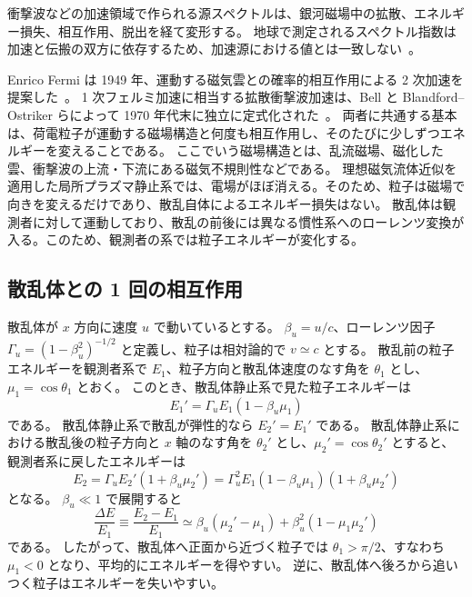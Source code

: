\documentclass[book,paper=a4,fontsize=11pt]{jlreq}
\begin{document}
衝撃波などの加速領域で作られる源スペクトルは、銀河磁場中の拡散、エネルギー損失、相互作用、脱出を経て変形する。
地球で測定されるスペクトル指数は加速と伝搬の双方に依存するため、加速源における値とは一致しない~\cite{Gabici2019,PDGCosmicRays}。

Enrico Fermi は 1949 年、運動する磁気雲との確率的相互作用による 2 次加速を提案した~\cite{Fermi1949}。
1 次フェルミ加速に相当する拡散衝撃波加速は、Bell と Blandford--Ostriker らによって 1970 年代末に独立に定式化された~\cite{Bell1978,BlandfordOstriker1978,Drury1983}。
両者に共通する基本は、荷電粒子が運動する磁場構造と何度も相互作用し、そのたびに少しずつエネルギーを変えることである。
ここでいう磁場構造とは、乱流磁場、磁化した雲、衝撃波の上流・下流にある磁気不規則性などである。
理想磁気流体近似を適用した局所プラズマ静止系では、電場がほぼ消える。そのため、粒子は磁場で向きを変えるだけであり、散乱自体によるエネルギー損失はない。
散乱体は観測者に対して運動しており、散乱の前後には異なる慣性系へのローレンツ変換が入る。このため、観測者の系では粒子エネルギーが変化する。

\subsection{散乱体との 1 回の相互作用}
散乱体が \(x\) 方向に速度 \(u\) で動いているとする。
\(\beta_u=u/c\)、ローレンツ因子 \(\Gamma_u=(1-\beta_u^2)^{-1/2}\) と定義し、粒子は相対論的で \(v\simeq c\) とする。
散乱前の粒子エネルギーを観測者系で \(E_1\)、粒子方向と散乱体速度のなす角を \(\theta_1\) とし、\(\mu_1=\cos\theta_1\) とおく。
このとき、散乱体静止系で見た粒子エネルギーは
\begin{equation}
  E_1'
  =
  \Gamma_u E_1(1-\beta_u\mu_1)
\end{equation}
である。
散乱体静止系で散乱が弾性的なら \(E_2'=E_1'\) である。
散乱体静止系における散乱後の粒子方向と \(x\) 軸のなす角を \(\theta_2'\) とし、\(\mu_2'=\cos\theta_2'\) とすると、観測者系に戻したエネルギーは
\begin{equation}
  E_2
  =
  \Gamma_u E_2'(1+\beta_u\mu_2')
  =
  \Gamma_u^2 E_1(1-\beta_u\mu_1)(1+\beta_u\mu_2')
  \label{eq:fermi_energy_transform}
\end{equation}
となる。
\(\beta_u\ll1\) で展開すると
\begin{equation}
  \frac{\Delta E}{E_1}
  \equiv
  \frac{E_2-E_1}{E_1}
  \simeq
  \beta_u(\mu_2'-\mu_1)
  +
  \beta_u^2(1-\mu_1\mu_2')
\end{equation}
である。
したがって、散乱体へ正面から近づく粒子では \(\theta_1>\pi/2\)、すなわち \(\mu_1<0\) となり、平均的にエネルギーを得やすい。
逆に、散乱体へ後ろから追いつく粒子はエネルギーを失いやすい。
\end{document}
